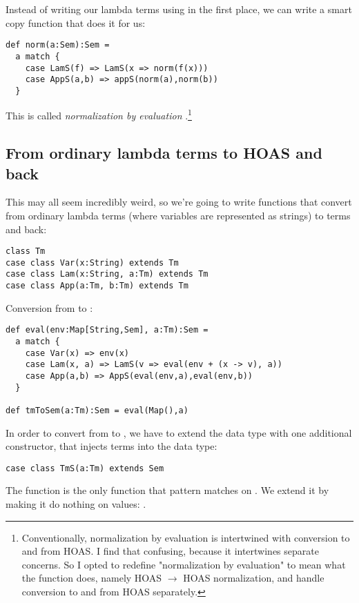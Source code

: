 Instead of writing our lambda terms using  in the first place, we can write a smart copy function that does it for us:

\begin{lstlisting}
def norm(a:Sem):Sem =
  a match {
    case LamS(f) => LamS(x => norm(f(x)))
    case AppS(a,b) => appS(norm(a),norm(b))
  }
\end{lstlisting}

This is called \emph{normalization by evaluation} \cite{berger91}.\footnote{Conventionally, normalization by evaluation is intertwined with conversion to and from HOAS. I find that confusing, because it intertwines separate concerns. So I opted to redefine "normalization by evaluation" to mean what the  function does, namely HOAS $\to$ HOAS normalization, and handle conversion to and from HOAS separately.}

\subsection{From ordinary lambda terms to HOAS and back}

This may all seem incredibly weird, so we're going to write functions that convert from ordinary lambda terms (where variables are represented as strings) to  terms and back:

\begin{lstlisting}
class Tm
case class Var(x:String) extends Tm
case class Lam(x:String, a:Tm) extends Tm
case class App(a:Tm, b:Tm) extends Tm
\end{lstlisting}

Conversion from  to :

\begin{lstlisting}
def eval(env:Map[String,Sem], a:Tm):Sem =
  a match {
    case Var(x) => env(x)
    case Lam(x, a) => LamS(v => eval(env + (x -> v), a))
    case App(a,b) => AppS(eval(env,a),eval(env,b))
  }

def tmToSem(a:Tm):Sem = eval(Map(),a)
\end{lstlisting}

In order to convert from  to , we have to extend the  data type with one additional constructor, that injects  terms into the  data type:

\begin{lstlisting}
case class TmS(a:Tm) extends Sem
\end{lstlisting}

The  function is the only function that pattern matches on . We extend it by making it do nothing on  values: .

